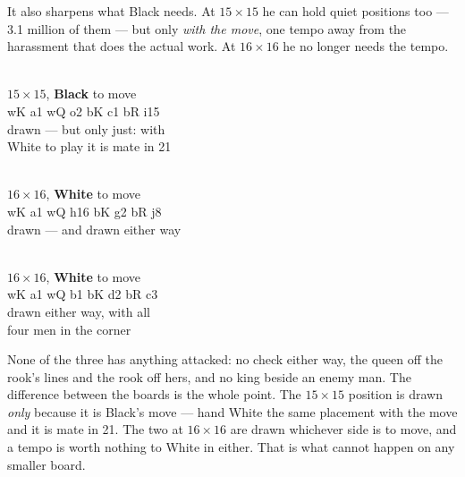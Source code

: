 \documentclass[11pt]{article}
\begin{document}
\smallskip
\noindent
It also sharpens what Black needs. At $15\times15$ he can hold quiet positions
too --- 3.1 million of them --- but only \emph{with the move}, one tempo away
from the harassment that does the actual work. At $16\times16$ he no longer
needs the tempo.

\begin{center}
\begin{minipage}{0.31\textwidth}\centering
  \\[1.5mm]
  {\scriptsize\color{kqkr}$15\times15$, \textbf{Black} to move\\wK a1 wQ o2 bK c1 bR i15\\drawn --- but only just: with\\White to play it is mate in 21}
\end{minipage}
\hfill
\begin{minipage}{0.31\textwidth}\centering
  \\[1.5mm]
  {\scriptsize\color{kqkr}$16\times16$, \textbf{White} to move\\wK a1 wQ h16 bK g2 bR j8\\drawn --- and drawn either way}
\end{minipage}
\hfill
\begin{minipage}{0.31\textwidth}\centering
  \\[1.5mm]
  {\scriptsize\color{kqkr}$16\times16$, \textbf{White} to move\\wK a1 wQ b1 bK d2 bR c3\\drawn either way, with all\\four men in the corner}
\end{minipage}
\end{center}

\noindent
None of the three has anything attacked: no check either way, the queen off the
rook's lines and the rook off hers, and no king beside an enemy man. The
difference between the boards is the whole point. The $15\times15$ position is
drawn \emph{only} because it is Black's move --- hand White the same placement
with the move and it is mate in 21. The two at $16\times16$ are drawn whichever
side is to move, and a tempo is worth nothing to White in either. That is what
cannot happen on any smaller board.
\end{document}
